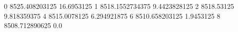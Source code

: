 0 8525.408203125 16.6953125
1 8518.1552734375 9.4423828125
2 8518.53125 9.818359375
4 8515.0078125 6.294921875
6 8510.658203125 1.9453125
8 8508.712890625 0.0
